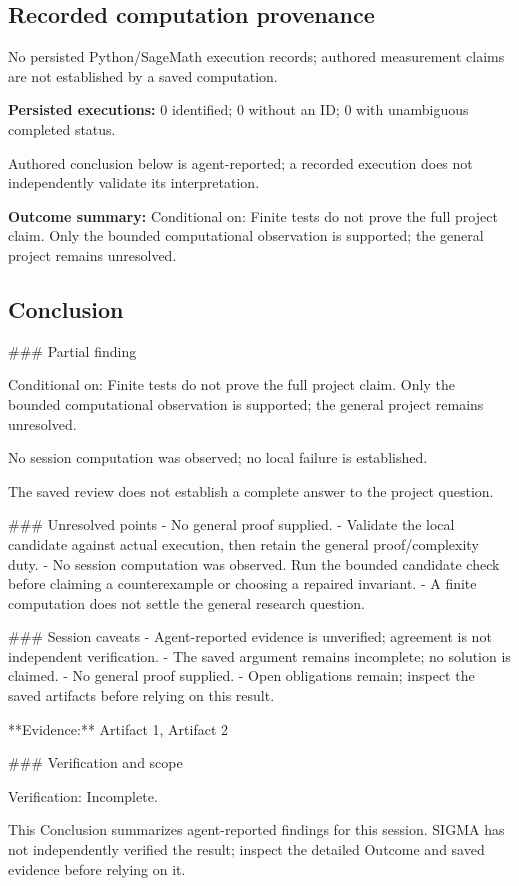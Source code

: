 \documentclass[11pt]{article}
\begin{document}
\subsection{Recorded computation provenance}
No persisted Python/SageMath execution records; authored measurement claims are not established by a saved computation.\par
\textbf{Persisted executions:} 0 identified; 0 without an ID; 0 with unambiguous completed status.\par
Authored conclusion below is agent-reported; a recorded execution does not independently validate its interpretation.\par
\textbf{Outcome summary:} Conditional on: Finite tests do not prove the full project claim. Only the bounded computational observation is supported; the general project remains unresolved.\par
\subsection{Conclusion}
\#\#\# Partial finding

Conditional on: Finite tests do not prove the full project claim. Only the bounded computational observation is supported; the general project remains unresolved.

No session computation was observed; no local failure is established.

The saved review does not establish a complete answer to the project question.

\#\#\# Unresolved points
- No general proof supplied.
- Validate the local candidate against actual execution, then retain the general proof/complexity duty.
- No session computation was observed. Run the bounded candidate check before claiming a counterexample or choosing a repaired invariant.
- A finite computation does not settle the general research question.

\#\#\# Session caveats
- Agent-reported evidence is unverified; agreement is not independent verification.
- The saved argument remains incomplete; no solution is claimed.
- No general proof supplied.
- Open obligations remain; inspect the saved artifacts before relying on this result.

**Evidence:** Artifact 1, Artifact 2

\#\#\# Verification and scope

Verification: Incomplete.

This Conclusion summarizes agent-reported findings for this session. SIGMA has not independently verified the result; inspect the detailed Outcome and saved evidence before relying on it.
\end{document}
